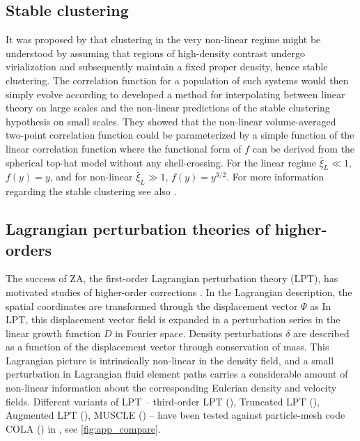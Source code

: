 \subsection{Stable clustering}
It was proposed by \textcite{1974ApJ...189L..51P} that clustering in the very non-linear regime might be understood by assuming that regions of high-density contrast undergo virialization and subsequently maintain a fixed proper density, hence stable clustering. The correlation function for a population of such systems would then simply evolve according to
\textcite{1991ApJ...374L...1H} developed a method for interpolating between linear theory on large scales and the non-linear predictions of the stable clustering hypothesis on small scales. They showed that the non-linear volume-averaged two-point correlation function could be parameterized by a simple function of the linear correlation function
where the functional form of $f$ can be derived from the spherical top-hat model without any shell-crossing. For the linear regime $\bar\xi_{L}\ll1$, $f(y)=y$, and for non-linear $\bar\xi_{L}\gg1$, $f(y)=y^{3/2}$. For more information regarding the stable clustering see  also \textcite{1996MNRAS.280L..19P,2003MNRAS.341.1311S}.
\subsection{Lagrangian perturbation theories of higher-orders}
The success of ZA, the first-order Lagrangian perturbation theory (LPT), has motivated studies of higher-order corrections \parencite[see e.g.][]{10.1093/mnras/264.2.375,2002PhR...367....1B,2010MNRAS.403.1859J,2014ApJ...788...63S}. In the Lagrangian description, the spatial coordinates are transformed through the displacement vector $\Psi$ as
In LPT, this displacement vector field is expanded in a perturbation series in the linear growth function $D$ in Fourier space. Density perturbations $\delta$ are described as a function of the displacement vector through conservation of mass. This Lagrangian picture is intrinsically non-linear in the density field, and a small perturbation in Lagrangian fluid element paths carries a considerable amount of non-linear information about the corresponding Eulerian density and velocity fields. Different variants of LPT -- third-order LPT (\cite{10.1093/mnras/264.2.375}), Truncated LPT (\cite{10.1093/mnras/260.4.765}), Augmented LPT (\cite{10.1093/mnrasl/slt101}), MUSCLE (\cite{10.1093/mnrasl/slv141}) -- have been tested against particle-mesh code COLA (\cite{2013JCAP...06..036T}) in \cite{2017JCAP...07..050M}, see \autoref{fig:app_compare}.

